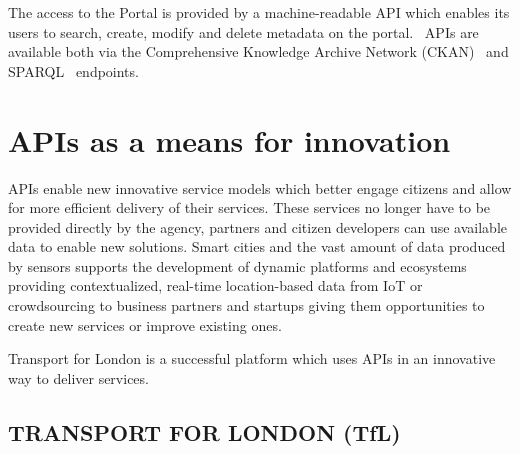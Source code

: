 The access to the Portal is provided by a machine-readable API which enables its
users to search, create, modify and delete metadata on the portal.~\citep{edp_data_portal} APIs are
available both via the Comprehensive Knowledge Archive Network (CKAN)~\citep{edp_api_v3} and
SPARQL~\citep{edp_sparql} endpoints.

\section{APIs as a means for innovation}

APIs enable new innovative service models which better engage citizens and allow
for more efficient delivery of their services. These services no longer have to
be provided directly by the agency, partners and citizen developers can use
available data to enable new solutions. Smart cities and the vast amount of data
produced by sensors supports the development of dynamic platforms and ecosystems
providing contextualized, real-time location-based data from IoT or crowdsourcing
to business partners and startups giving them opportunities to create new services
or improve existing ones.

Transport for London is a successful platform which uses APIs in an innovative way to deliver services.

\subsection{TRANSPORT FOR LONDON (TfL)}

